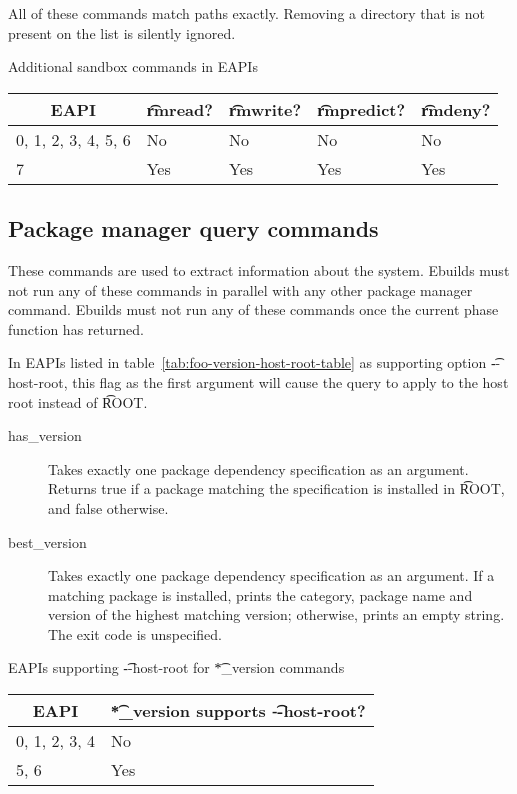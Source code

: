 All of these commands match paths exactly. Removing a directory that is not present on the list
is silently ignored.

\begin{centertable}{Additional sandbox commands in EAPIs}
    \label{tab:sandbox-command-table}
    \begin{tabular}{lllll}
      \toprule
      \multicolumn{1}{c}{\textbf{EAPI}} &
      \multicolumn{1}{c}{\textbf{\t{rmread}?}} &
      \multicolumn{1}{c}{\textbf{\t{rmwrite}?}} &
      \multicolumn{1}{c}{\textbf{\t{rmpredict}?}} &
      \multicolumn{1}{c}{\textbf{\t{rmdeny}?}} \\
      \midrule
      0, 1, 2, 3, 4, 5, 6 & No  & No  & No  & No  \\
      7                   & Yes & Yes & Yes & Yes \\
      \bottomrule
    \end{tabular}
\end{centertable}

\subsection{Package manager query commands}
These commands are used to extract information about the system. Ebuilds must not run any of
these commands in parallel with any other package manager command. Ebuilds must not run any of
these commands once the current phase function has returned.

 In EAPIs listed in table~\ref{tab:foo-version-host-root-table} as
supporting option \t{-{}-host-root}, this flag as the first argument will cause the query to apply
to the host root instead of \t{ROOT}.
\begin{description}
\item[has_version] Takes exactly one package dependency specification as an argument. Returns
    true if a package matching the specification is installed in \t{ROOT}, and false otherwise.
\item[best_version] Takes exactly one package dependency specification as an argument. If a
    matching package is installed, prints the category, package name and version of the highest
    matching version; otherwise, prints an empty string. The exit code is unspecified.
\end{description}

\begin{centertable}{EAPIs supporting \t{-{}-host-root} for \t{*_version} commands}
    \label{tab:foo-version-host-root-table}
    \begin{tabular}{ll}
      \toprule
      \multicolumn{1}{c}{\textbf{EAPI}} &
      \multicolumn{1}{c}{\textbf{\t{*_version} supports \t{-{}-host-root}?}} \\
      \midrule
      0, 1, 2, 3, 4     & No  \\
      5, 6              & Yes \\
      \bottomrule
    \end{tabular}
\end{centertable}


